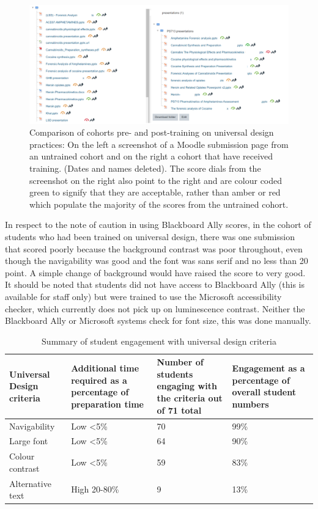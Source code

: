 \documentclass[11.5pt]{sig-alternate} %
\begin{document}
\begin{large}
\begin{figure}[htb]
    \centering
    \includegraphics[width=\textwidth]{images/fig4.png}
    \caption{Comparison of cohorts pre- and post-training on universal design practices: On the left a screenshot of a Moodle submission page from an untrained cohort and on the right a cohort that have received training. (Dates and names deleted). The score dials from the screenshot on the right also point to the right and are colour coded green to signify that they are acceptable, rather than amber or red which populate the majority of the scores from the untrained cohort.}
    \label{Figure 4}
\end{figure}

In respect to the note of caution in using Blackboard Ally scores,  in the cohort of students who had been trained on universal design, there was one submission that scored poorly because the background contrast was poor throughout, even though the navigability was good and the font was sans serif and no less than 20 point. A simple change of background would have raised the score to very good. It should be noted that students did not have access to Blackboard Ally (this is available for staff only) but were trained to use the Microsoft accessibility checker, which currently does not pick up on luminescence contrast. Neither the Blackboard Ally or Microsoft systems check for font size, this was done manually.

\begin{table}[th]
\caption{Summary of student engagement with universal design criteria}
\begin{tabular}{|l|l|l|l|}
\hline
\textbf{Universal Design criteria} & \textbf{Additional time required as a percentage of preparation time} & \textbf{Number of students engaging with the criteria out of 71 total} & \textbf{Engagement as a percentage of overall student numbers} \\ \hline
Navigability & Low <5\% & 70 & 99\% \\ \hline
Large font & Low <5\% & 64 & 90\% \\ \hline
Colour contrast & Low <5\% & 59 & 83\% \\ \hline
Alternative text & High 20-80\% & 9 & 13\% \\ \hline
\end{tabular}
\end{table}


\end{large}
\end{document}

